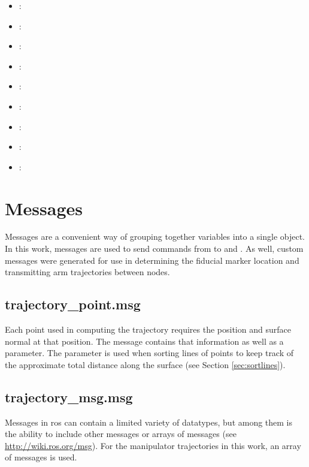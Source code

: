 \begin{itemize}

\item {} : 
\item {} : 
\item {} : 
\item {} : 
\item {} : 
\item {} : 
\item {} : 
\item {} : 
\item {} : 
\end{itemize}

\section{Messages}

Messages are a convenient way of grouping together variables into a single object. In this work, messages are used to send commands from  to  and . As well, custom messages were generated for use in determining the fiducial marker location and transmitting arm trajectories between nodes.\\

\subsection{trajectory\_point.msg}
Each point used in computing the trajectory requires the position and surface normal at that position. The  message contains that information as well as a  parameter. The  parameter is used when sorting lines of points to keep track of the approximate total distance along the surface (see Section \ref{sec:sortlines}).\\
\subsection{trajectory\_msg.msg}
\label{sec:trajmsg}
Messages in \acrshort{ros} can contain a limited variety of datatypes, but among them is the ability to include other messages or arrays of messages (see \url{http://wiki.ros.org/msg}). For the manipulator trajectories in this work, an array of  messages is used.\\

